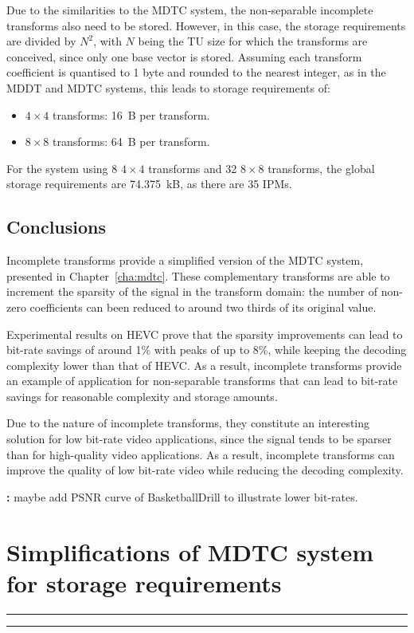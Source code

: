 \documentclass[11pt,a4paper,openright,twoside]{book}
\providecommand{\todo}[1]{
	\begin{center}
		\colorbox{yellowish}{
			\begin{minipage}{0.95\linewidth}
				\textbf{\color{redish}{TODO}:} #1
			\end{minipage}
		}
	\end{center}
}
\providecommand{\chaptertoc}{
	\startcontents[chapters]
	\hrule
	\vspace{1em}
	\printcontents[chapters]{}{1}{{\sf\large\bfseries Contents}}
	\hrule
}
\numberwithin{equation}{section} %
\numberwithin{figure}{section} %
\numberwithin{table}{section} %
\begin{document}
Due to the similarities to the \ac{MDTC} system, the non-separable incomplete
transforms also need to be stored.
However, in this case, the storage requirements are divided by $N^2$, with $N$
being the \ac{TU} size for which the transforms are conceived, since only one
base vector is stored.
Assuming each transform coefficient is quantised to 1 byte and rounded to the
nearest integer, as in the \ac{MDDT} and \ac{MDTC} systems, this leads to
storage requirements of:
\begin{itemize}
	\item $4\times4$ transforms: \SI{16}{B} per transform.
	\item $8\times8$ transforms: \SI{64}{B} per transform.
\end{itemize}
For the system using 8 $4\times4$ transforms and 32 $8\times8$ transforms, the
global storage requirements are \SI{74.375}{\kilo B}, as there are 35
\acp{IPM}.

\section{Conclusions}
\label{sec:it_conclusions}

Incomplete transforms provide a simplified version of the \ac{MDTC} system,
presented in Chapter~\ref{cha:mdtc}.
These complementary transforms are able to increment the sparsity of the
signal in the transform domain:
the number of non-zero coefficients can been reduced to around two thirds of
its original value.

Experimental results on \ac{HEVC} prove that the sparsity improvements can
lead to bit-rate savings of around 1\% with peaks of up to 8\%, while keeping
the decoding complexity lower than that of \ac{HEVC}.
As a result, incomplete transforms provide an example of application for
non-separable transforms that can lead to bit-rate savings for reasonable
complexity and storage amounts.

Due to the nature of incomplete transforms, they constitute an interesting
solution for low bit-rate video applications, since the signal tends to be
sparser than for high-quality video applications.
As a result, incomplete transforms can improve the quality of low bit-rate
video while reducing the decoding complexity.

\todo{maybe add PSNR curve of BasketballDrill to illustrate lower bit-rates.}

\chapter{Simplifications of \acs{MDTC} system for storage requirements}
\label{cha:real_world_system}
\chaptertoc
\end{document}
